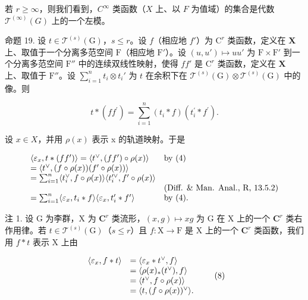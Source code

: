 若 \(r \geqslant \infty\)，则我们看到，\(C^\infty\) 类函数（\(X\) 上、以 \(F\) 为值域）的集合是代数 \(\mathcal{T}^{(\infty)}(G)\) 上的一个左模。

命题 19. 设 \(t \in \mathcal{T}^{(s)}(\mathrm{G})\)，\(s \leqslant r\)。设 \(f\)（相应地 \(f'\)）为 \(\mathrm{C}^r\) 类函数，定义在 \(\mathbf{X}\) 上、取值于一个分离多范空间 \(\mathrm{F}\)（相应地 \(\mathrm{F}'\)）。设 \((u, u') \mapsto uu'\) 为 \(\mathrm{F} \times \mathrm{F}'\) 到一个分离多范空间 \(\mathrm{F}''\) 中的连续双线性映射，使得 \(ff'\) 是 \(\mathrm{C}^r\) 类函数，定义在 \(\mathbf{X}\) 上、取值于 \(\mathrm{F}''\)。设 \(\sum_{i=1}^{n} t_i \otimes t_i'\) 为 \(t\) 在余积下在 \(\mathcal{T}^{(s)}(\mathrm{G}) \otimes \mathcal{T}^{(s)}(\mathrm{G})\) 中的像。则

\[
t * (f f ^ {\prime}) = \sum_ {i = 1} ^ {n} (t _ {i} * f) (t _ {i} ^ {\prime} * f ^ {\prime}).
\]

设 \(x \in X\)，并用 \(\rho(x)\) 表示 x 的轨道映射。于是

\[
\begin{array}{l l} \langle \varepsilon_ {x}, t * (f f ^ {\prime}) \rangle = \langle t ^ {\vee}, (f f ^ {\prime}) \circ \rho (x) \rangle & \text {by (4)} \\ = \langle t ^ {\vee}, (f \circ \rho (x)) (f ^ {\prime} \circ \rho (x)) \rangle \\ = \sum_ {i = 1} ^ {n} \langle t _ {i} ^ {\vee}, f \circ \rho (x) \rangle \langle t _ {i} ^ {\prime \vee}, f ^ {\prime} \circ \rho (x) \rangle \\ & (\text {Diff. \& Man. Anal., R, 13.5.2}) \\ = \sum_ {i = 1} ^ {n} \langle \varepsilon_ {x}, t _ {i} * f \rangle \langle \varepsilon_ {x}, t _ {i} ^ {\prime} * f ^ {\prime} \rangle & \text {by (4).} \end{array}
\]

注 1. 设 G 为李群，X 为 \(\mathbf{C}^r\) 类流形，\((x,g)\mapsto xg\) 为 G 在 X 上的一个 \(\mathbf{C}^r\) 类右作用律。若 \(t\in \mathcal{T}^{(s)}(\mathrm{G})\)（\(s\leqslant r\)）且 \(f\colon \mathrm{X}\to \mathrm{F}\) 是 X 上的一个 \(\mathbf{C}^r\) 类函数，我们用 \(f*t\) 表示 X 上由

\[
\begin{array}{r l} \langle \varepsilon_ {x}, f * t \rangle & = \langle \varepsilon_ {x} * t ^ {\vee}, f \rangle \\ & = \langle \rho (x) _ {*} (t ^ {\vee}), f \rangle \\ & = \langle t ^ {\vee}, f \circ \rho (x) \rangle \\ & = \langle t, (f \circ \rho (x)) ^ {\vee} \rangle . \end{array}\tag{8}
\]

